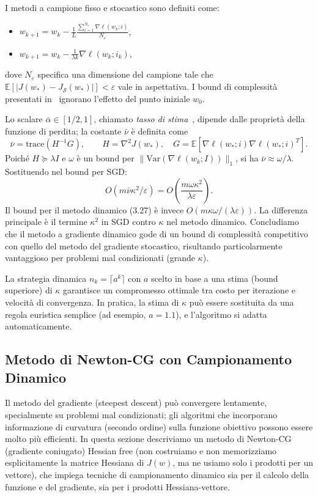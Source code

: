\documentclass[a4paper,12pt]{article}
\begin{document}
I metodi a campione fisso e stocastico sono definiti come:
\begin{itemize}
  \item {} \(w_{k+1} = w_k - \frac{1}{L} \frac{\sum_{i=1}^{N_\varepsilon} \nabla \ell(w_k;i)}{N_\varepsilon}\),
  \item {} \(w_{k+1} = w_k - \frac{1}{\lambda k} \nabla \ell(w_k; i_k)\),
\end{itemize}
dove \(N_\varepsilon\) specifica una dimensione del campione tale che \(\mathbb{E}[|J(w_*) - J_{\mathcal{S}}(w_*)|] < \varepsilon\) vale in aspettativa. I bound di complessità presentati in~\cite{bottou2008} ignorano l'effetto del punto iniziale \(w_0\).

Lo scalare \(\bar{\alpha} \in [1/2, 1]\), chiamato \textit{tasso di stima}~\cite{bottou2008}, dipende dalle proprietà della funzione di perdita; la costante \(\bar{\nu}\) è definita come
\[
\bar{\nu} = \mathrm{trace}(H^{-1}G), \qquad H = \nabla^2 J(w_*), \quad G = \mathbb{E}[\nabla \ell(w_*; i) \nabla \ell(w_*; i)^T]. \tag{3.29}
\]
Poiché \(H \succeq \lambda I\) e \(\omega\) è un bound per \(\|\mathrm{Var}(\nabla \ell(w_k;I))\|_1\), si ha \(\bar{\nu} \approx \omega/\lambda\). Sostituendo nel bound per SGD:
\[
O(m\bar{\nu}\kappa^2/\varepsilon) = O\!\left(\frac{m \omega \kappa^2}{\lambda \varepsilon}\right). \tag{3.30}
\]
Il bound per il metodo dinamico (3.27) è invece \(O(m\kappa\omega/(\lambda\varepsilon))\). La differenza principale è il termine \(\kappa^2\) in SGD contro \(\kappa\) nel metodo dinamico. Concludiamo che il metodo a gradiente dinamico gode di un bound di complessità competitivo con quello del metodo del gradiente stocastico, risultando particolarmente vantaggioso per problemi mal condizionati (grande \(\kappa\)).

La strategia dinamica \(n_k = \lceil a^k \rceil\) con \(a\) scelto in base a una stima (bound superiore) di \(\kappa\) garantisce un compromesso ottimale tra costo per iterazione e velocità di convergenza. In pratica, la stima di \(\kappa\) può essere sostituita da una regola euristica semplice (ad esempio, \(a=1.1\)), e l'algoritmo si adatta automaticamente.
\newpage
\subsection{Metodo di Newton-CG con Campionamento Dinamico}

Il metodo del gradiente (steepest descent) può convergere lentamente, specialmente su problemi mal condizionati; gli algoritmi che incorporano informazione di curvatura (secondo ordine) sulla funzione obiettivo possono essere molto più efficienti. In questa sezione descriviamo un metodo di Newton-CG (gradiente coniugato) Hessian free (non costruiamo e non memorizziamo esplicitamente la matrice Hessiana di $J(w)$, ma ne usiamo solo i prodotti per un vettore), che impiega tecniche di campionamento dinamico sia per il calcolo della funzione e del gradiente, sia per i prodotti Hessiana-vettore.
\end{document}
